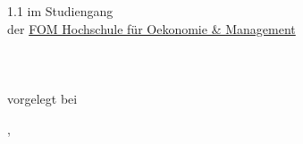 \begin{titlepage}
\begin{center}
\begin{spacing}{1.1}
  	{\large im Studiengang {\large \daStudiengang}} \\%
  	{\large der \href{\daUniURL}{FOM Hochschule für Oekonomie \& Management}} \\%
    {\normalsize\daAutor}\\%
    {\normalsize\daAutorAdresse}\\%
    {\normalsize\daAutorPLZ~\daAutorOrt}\\%
    {\small vorgelegt bei}\\%
    {\normalsize\daGutachterEins}\par%
  \end{spacing}
  {\normalsize \daAutorOrt, \daDate}
\end{center}

\setlength{\spalteZwei}{\textwidth}
\addtolength{\spalteZwei}{-\spalteEins}


\end{titlepage}
